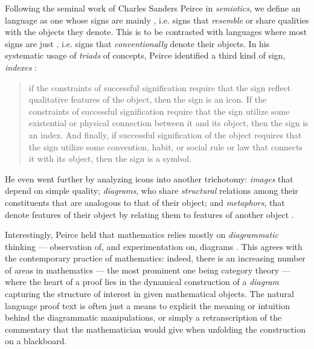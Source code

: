 Following the seminal work of Charles Sanders Peirce in
\emph{semiotics}, we define an  language as one
whose signs are mainly , i.e. signs that \emph{resemble} or share
qualities with the objects they denote. This is to be contrasted with
 languages where most signs are just , i.e.
signs that \emph{conventionally} denote their objects. In his systematic usage
of \emph{triads} of concepts, Peirce identified a third kind of sign,
\emph{indexes} :
\begin{quote}
  if the constraints of successful signification require that the sign reflect
  qualitative features of the object, then the sign is an icon. If the
  constraints of successful signification require that the sign utilize some
  existential or physical connection between it and its object, then the sign is
  an index. And finally, if successful signification of the object requires that
  the sign utilize some convention, habit, or social rule or law that connects
  it with its object, then the sign is a symbol.
\end{quote}
He even went further by analyzing icons into another
trichotomy:
\emph{images} that depend on simple quality; \emph{diagrams}, who share
\emph{structural} relations among their constituents that are analogous to that
of their object; and \emph{metaphors}, that denote features of their object by
relating them to features of another object .

Interestingly, Peirce held that mathematics relies mostly on \emph{diagrammatic}
thinking --- observation of, and experimentation on, diagrams
. This agrees with the contemporary
practice of mathematics: indeed, there is an increasing number of areas in
mathematics --- the most prominent one being category theory --- where the heart
of a proof lies in the dynamical construction of a \emph{diagram} capturing the
structure of interest in given mathematical objects. The natural language proof
text is often just a means to explicit the meaning or intuition behind the
diagrammatic manipulations, or simply a retranscription of the commentary that
the mathematician would give when unfolding the construction on a blackboard.

